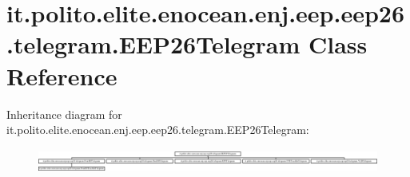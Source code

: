 \hypertarget{classit_1_1polito_1_1elite_1_1enocean_1_1enj_1_1eep_1_1eep26_1_1telegram_1_1_e_e_p26_telegram}{}\section{it.\+polito.\+elite.\+enocean.\+enj.\+eep.\+eep26.\+telegram.\+E\+E\+P26\+Telegram Class Reference}
\label{classit_1_1polito_1_1elite_1_1enocean_1_1enj_1_1eep_1_1eep26_1_1telegram_1_1_e_e_p26_telegram}
Inheritance diagram for it.\+polito.\+elite.\+enocean.\+enj.\+eep.\+eep26.\+telegram.\+E\+E\+P26\+Telegram\+:\begin{figure}[H]
\begin{center}
\leavevmode
\includegraphics[height=0.798100cm]{classit_1_1polito_1_1elite_1_1enocean_1_1enj_1_1eep_1_1eep26_1_1telegram_1_1_e_e_p26_telegram}
\end{center}
\end{figure}
